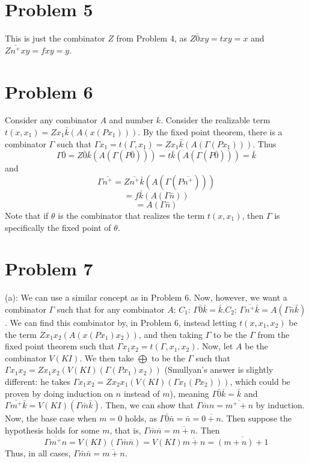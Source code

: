 \documentclass{article}
\theoremstyle{definition}
\begin{document}
\section*{Problem 5}
This is just the combinator $Z$ from Problem 4, as $Z\bar{0}xy=txy=x$ and $Z\overline{n^+}xy=fxy=y$.

\section*{Problem 6}
Consider any combinator $A$ and number $k$. Consider the realizable term $t(x,x_1)=Zx_1\bar{k}(A(x(Px_1)))$. By the fixed point theorem, there is a combinator $\Gamma$ such that 
$\Gamma x_1=t(\Gamma,x_1)=Zx_1\bar{k}(A(\Gamma(Px_1)))$. Thus 
\[ \Gamma\bar{0}=Z\bar{0}\bar{k}(A(\Gamma(P\bar{0})))=t\bar{k}(A(\Gamma(P\bar{0})))=\bar{k} \]
and \[ \Gamma\overline{n^+}=Z\overline{n^+}\bar{k}(A(\Gamma(P\overline{n^+}))) \]
\[ =f\bar{k}(A(\Gamma\bar{n})) \]
\[ =A(\Gamma\bar{n}) \]
Note that if $\theta$ is the combinator that realizes the term $t(x,x_1)$, then $\Gamma$ is specifically the fixed point of $\theta$.

\section*{Problem 7}
(a): We can use a similar concept as in Problem 6. Now, however, we want a combinator $\Gamma$ such that for any combinator $A$: 
\newline $C_1$: $\Gamma \bar{0}\bar{k}=\bar{k}$.\newline $C_2$: $\Gamma \overline{n^+}\bar{k}=A(\Gamma\bar{n}\bar{k})$.\newline
We can find this combinator by, in Problem 6, instead letting $t(x,x_1,x_2)$ be the term $Zx_1x_2(A(x(Px_1)x_2))$, and then taking $\Gamma$ to be the 
$\Gamma$ from the fixed point theorem such that $\Gamma x_1x_2=t(\Gamma,x_1,x_2)$. Now, let $A$ be the combinator $V(KI)$. We then take $\bigoplus$ to be
the $\Gamma$ such that $\Gamma x_1x_2=Zx_1x_2(V(KI)(\Gamma (Px_1)x_2))$ (Smullyan's answer is slightly different: he takes $\Gamma x_1x_2=Zx_2x_1(V(KI)(\Gamma x_1(Px_2)))$, which could be proven by 
doing induction on $n$ instead of $m$), 
meaning $\Gamma \bar{0}\bar{k}=\bar{k}$ and $\Gamma \bar{m^+}\bar{k}=V(KI)(\Gamma\bar{m}\bar{k})$. 
Then, we can show that $\Gamma\overline{m}{n}=\overline{m^++n}$ by induction. Now, the base case when $m=0$ holds, as $\Gamma \bar{0}\bar{n}=\bar{n}=\overline{0+n}$. 
Then suppose the hypothesis holds for some $m$, that is, 
$\Gamma\overline{m}\overline{n}=\overline{m+n}$. Then \[ \Gamma\overline{m^+}{n}=V(KI)(\Gamma\bar{m}\bar{n})=V(KI)\overline{m+n}=\overline{(m+n)+1} \] Thus, in all cases, 
$\Gamma\bar{m}\bar{n}=\overline{m+n}$. 
\end{document}
